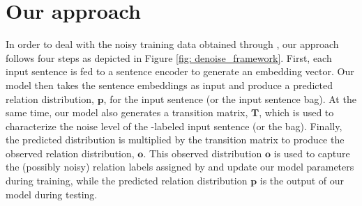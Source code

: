 \section{Our approach}\label{sec:approach}
%

In order to deal with the noisy training data obtained through \DS, our approach follows four steps as depicted in Figure \ref{fig: denoise_framework}.
First, each input sentence is fed to a sentence encoder to generate an embedding vector. Our model then takes the sentence embeddings as input and produce a predicted relation
distribution, $\mathbf{p}$, for the input sentence (or the input sentence bag). At the same time, our model also generates
a transition matrix, $\mathbf{T}$, which is used to characterize the noise level of the \DS-labeled input sentence (or the
bag). Finally, the predicted distribution is multiplied by the transition matrix to produce the observed relation
distribution, $\mathbf{o}$. This observed distribution $\mathbf{o}$ is used to capture the (possibly noisy) relation labels
assigned by \DS and update our model parameters during training, while the predicted relation distribution $\mathbf{p}$ is
the output of our model during testing.


